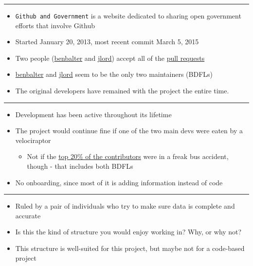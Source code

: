 \begin{center}\rule{3in}{0.4pt}\end{center}

\begin{itemize}
\itemsep1pt\parskip0pt
\item
  \texttt{Github and Government} is a website dedicated to sharing open
  government efforts that involve Github
\item
  Started January 20, 2013, most recent commit March 5, 2015
\item
  Two people (\href{https://github.com/benbalter}{benbalter} and
  \href{https://github.com/jlord}{jlord}) accept all of the
  \href{https://github.com/github/government.github.com/pulls?q=is\%3Apr+is\%3Aclosed}{pull
  requests}
\item
  \href{https://github.com/benbalter}{benbalter} and
  \href{https://github.com/jlord}{jlord} seem to be the only two
  maintainers (BDFLs)
\item
  The original developers have remained with the project the entire
  time.
\end{itemize}

\begin{center}\rule{3in}{0.4pt}\end{center}

\begin{itemize}
\itemsep1pt\parskip0pt
\item
  Development has been active throughout its lifetime
\item
  The project would continue fine if one of the two main devs were eaten
  by a velociraptor

  \begin{itemize}
  \itemsep1pt\parskip0pt
  \item
    Not if the
    \href{https://github.com/github/government.github.com/graphs/contributors}{top
    20\% of the contributors} were in a freak bus accident, though -
    that includes both BDFLs
  \end{itemize}
\item
  No onboarding, since most of it is adding information instead of code
\end{itemize}

\begin{center}\rule{3in}{0.4pt}\end{center}

\begin{itemize}
\itemsep1pt\parskip0pt
\item
  Ruled by a pair of individuals who try to make sure data is complete
  and accurate
\item
  Is this the kind of structure you would enjoy working in? Why, or why
  not?
\item
  This structure is well-suited for this project, but maybe not for a
  code-based project
\end{itemize}

